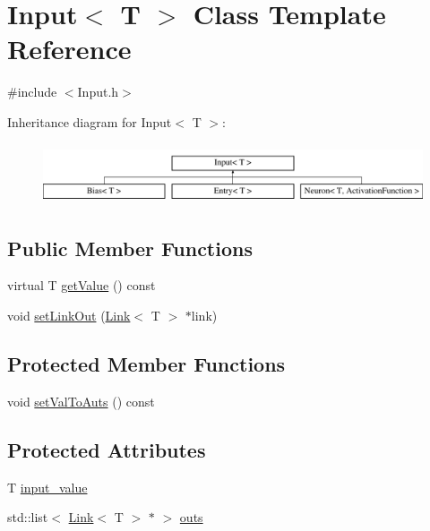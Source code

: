 \hypertarget{class_input}{\section{\-Input$<$ \-T $>$ \-Class \-Template \-Reference}
\label{class_input}
}


{\ttfamily \#include $<$\-Input.\-h$>$}

\-Inheritance diagram for \-Input$<$ \-T $>$\-:\begin{figure}[H]
\begin{center}
\leavevmode
\includegraphics[height=1.803543cm]{class_input}
\end{center}
\end{figure}
\subsection*{\-Public \-Member \-Functions}
\begin{DoxyCompactItemize}
\item 
virtual \-T \hyperlink{class_input_acd4a6ffcb32722a8f7dddf37b9ed0a66}{get\-Value} () const 
\item 
void \hyperlink{class_input_a74abbc00098fc83a0d6b1c67f4590464}{set\-Link\-Out} (\hyperlink{class_link}{\-Link}$<$ \-T $>$ $\ast$link)
\end{DoxyCompactItemize}
\subsection*{\-Protected \-Member \-Functions}
\begin{DoxyCompactItemize}
\item 
void \hyperlink{class_input_afa18c71eae21a7233fd6865e44c25df0}{set\-Val\-To\-Auts} () const 
\end{DoxyCompactItemize}
\subsection*{\-Protected \-Attributes}
\begin{DoxyCompactItemize}
\item 
\-T \hyperlink{class_input_aa2eb098d4f45d4ff4fcd2206fab7f3e5}{input\-\_\-value}
\item 
std\-::list$<$ \hyperlink{class_link}{\-Link}$<$ \-T $>$ $\ast$ $>$ \hyperlink{class_input_add27905b0d403f8908cf2bf7a95b740f}{outs}
\end{DoxyCompactItemize}


